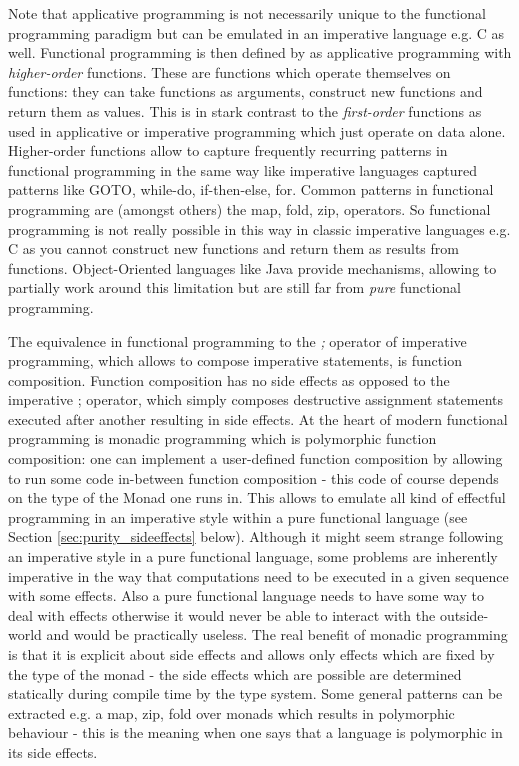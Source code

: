 Note that applicative programming is not necessarily unique to the functional programming paradigm but can be emulated in an imperative language e.g. C as well. Functional programming is then defined by \cite{maclennan_functional_1990} as applicative programming with \textit{higher-order} functions. These are functions which operate themselves on functions: they can take functions as arguments, construct new functions and return them as values. This is in stark contrast to the \textit{first-order} functions as used in applicative or imperative programming which just operate on data alone. Higher-order functions allow to capture frequently recurring patterns in functional programming in the same way like imperative languages captured patterns like GOTO, while-do, if-then-else, for. Common patterns in functional programming are (amongst others) the map, fold, zip, operators. So functional programming is not really possible in this way in classic imperative languages e.g. C as you cannot construct new functions and return them as results from functions. Object-Oriented languages like Java provide mechanisms, allowing to partially work around this limitation but are still far from \textit{pure} functional programming.

The equivalence in functional programming to the \textit{;} operator of imperative programming, which allows to compose imperative statements, is function composition. Function composition has no side effects as opposed to the imperative ; operator, which simply composes destructive assignment statements executed after another resulting in side effects.
At the heart of modern functional programming is monadic programming which is polymorphic function composition: one can implement a user-defined function composition by allowing to run some code in-between function composition - this code of course depends on the type of the Monad one runs in. This allows to emulate all kind of effectful programming in an imperative style within a pure functional language (see Section \ref{sec:purity_sideeffects} below). Although it might seem strange following an imperative style in a pure functional language, some problems are inherently imperative in the way that computations need to be executed in a given sequence with some effects. Also a pure functional language needs to have some way to deal with effects otherwise it would never be able to interact with the outside-world and would be practically useless. The real benefit of monadic programming is that it is explicit about side effects and allows only effects which are fixed by the type of the monad - the side effects which are possible are determined statically during compile time by the type system. Some general patterns can be extracted e.g. a map, zip, fold over monads which results in polymorphic behaviour - this is the meaning when one says that a language is polymorphic in its side effects.

